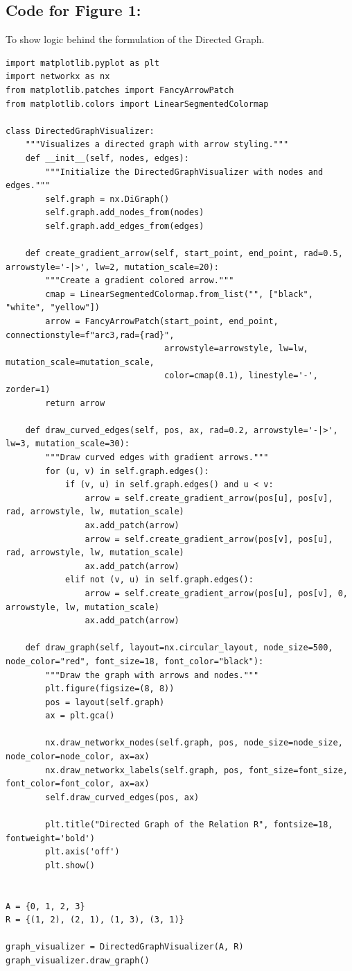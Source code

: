 \documentclass[12pt]{article}
\begin{document}
\subsection{Code for Figure 1:} To show logic behind the formulation of the Directed Graph.
\begin{lstlisting}
import matplotlib.pyplot as plt
import networkx as nx
from matplotlib.patches import FancyArrowPatch
from matplotlib.colors import LinearSegmentedColormap

class DirectedGraphVisualizer:
    """Visualizes a directed graph with arrow styling."""
    def __init__(self, nodes, edges):
        """Initialize the DirectedGraphVisualizer with nodes and edges."""
        self.graph = nx.DiGraph()
        self.graph.add_nodes_from(nodes)
        self.graph.add_edges_from(edges)

    def create_gradient_arrow(self, start_point, end_point, rad=0.5, arrowstyle='-|>', lw=2, mutation_scale=20):
        """Create a gradient colored arrow."""
        cmap = LinearSegmentedColormap.from_list("", ["black", "white", "yellow"])
        arrow = FancyArrowPatch(start_point, end_point, connectionstyle=f"arc3,rad={rad}",
                                arrowstyle=arrowstyle, lw=lw, mutation_scale=mutation_scale, 
                                color=cmap(0.1), linestyle='-', zorder=1)
        return arrow

    def draw_curved_edges(self, pos, ax, rad=0.2, arrowstyle='-|>', lw=3, mutation_scale=30):
        """Draw curved edges with gradient arrows."""
        for (u, v) in self.graph.edges():
            if (v, u) in self.graph.edges() and u < v:
                arrow = self.create_gradient_arrow(pos[u], pos[v], rad, arrowstyle, lw, mutation_scale)
                ax.add_patch(arrow)
                arrow = self.create_gradient_arrow(pos[v], pos[u], rad, arrowstyle, lw, mutation_scale)
                ax.add_patch(arrow)
            elif not (v, u) in self.graph.edges():
                arrow = self.create_gradient_arrow(pos[u], pos[v], 0, arrowstyle, lw, mutation_scale)
                ax.add_patch(arrow)

    def draw_graph(self, layout=nx.circular_layout, node_size=500, node_color="red", font_size=18, font_color="black"):
        """Draw the graph with arrows and nodes."""
        plt.figure(figsize=(8, 8))
        pos = layout(self.graph)
        ax = plt.gca()

        nx.draw_networkx_nodes(self.graph, pos, node_size=node_size, node_color=node_color, ax=ax)
        nx.draw_networkx_labels(self.graph, pos, font_size=font_size, font_color=font_color, ax=ax)
        self.draw_curved_edges(pos, ax)

        plt.title("Directed Graph of the Relation R", fontsize=18, fontweight='bold')
        plt.axis('off')
        plt.show()


A = {0, 1, 2, 3}
R = {(1, 2), (2, 1), (1, 3), (3, 1)}

graph_visualizer = DirectedGraphVisualizer(A, R)
graph_visualizer.draw_graph()
\end{lstlisting}
\end{document}
